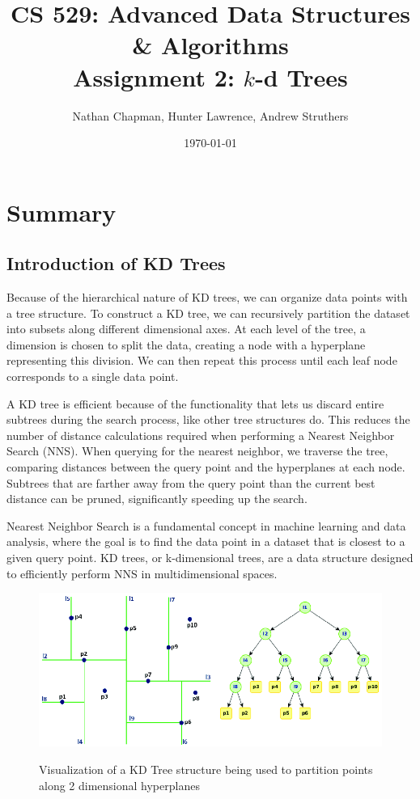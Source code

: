 \documentclass{article}
\title{\vspace*{-0.625in}CS 529: Advanced Data Structures \& Algorithms \\ Assignment 2: $k$-d Trees}
\author{Nathan Chapman, Hunter Lawrence, Andrew Struthers}
\date{\today}
\begin{document}
    \maketitle

    \section*{Summary}
    \subsection*{Introduction of KD Trees}
Because of the hierarchical nature of KD trees, we can organize data points with a tree structure. To construct a KD tree, we can recursively partition the dataset into subsets along different dimensional axes. At each level of the tree, a dimension is chosen to split the data, creating a node with a hyperplane representing this division. We can then repeat this process until each leaf node corresponds to a single data point.

A KD tree is efficient because of the functionality that lets us discard entire subtrees during the search process, like other tree structures do. This reduces the number of distance calculations required when performing a Nearest Neighbor Search (NNS). When querying for the nearest neighbor, we traverse the tree, comparing distances between the query point and the hyperplanes at each node. Subtrees that are farther away from the query point than the current best distance can be pruned, significantly speeding up the search.

Nearest Neighbor Search is a fundamental concept in machine learning and data analysis, where the goal is to find the data point in a dataset that is closest to a given query point. KD trees, or k-dimensional trees, are a data structure designed to efficiently perform NNS in multidimensional spaces.

\begin{figure}[h]
    \centering
    \includegraphics[width=\textwidth,keepaspectratio]{Images/space_partition.png}
    \label{fig:space_partition}
    \caption{Visualization of a KD Tree structure being used to partition points along 2 dimensional hyperplanes}
\end{figure}
\end{document}
